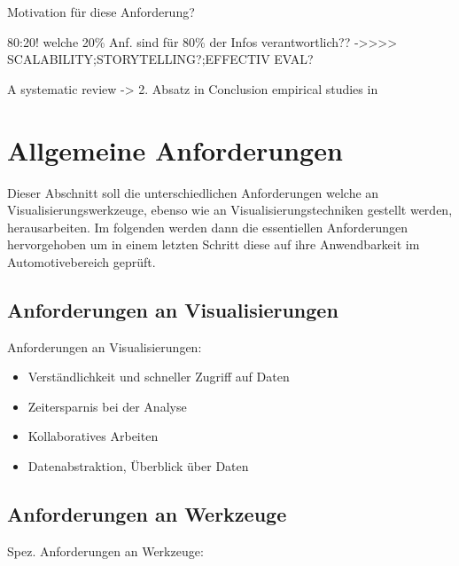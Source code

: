 \documentclass[draft=false
              ,paper=a4
              ,twoside=false
              ,fontsize=11pt
              ,headsepline
              ,BCOR10mm
              ,DIV11
              ]{scrbook}
\begin{document}
Motivation für diese Anforderung?

80:20! welche 20\% Anf. sind für 80\% der Infos verantwortlich??\newline
->>>> SCALABILITY;STORYTELLING?;EFFECTIV EVAL?

A systematic review -> 2. Absatz in Conclusion \cite{isenberg_systematic_2013} \newline
empirical studies in \cite{lam_empirical_2012}
\fi      %
\section{Allgemeine Anforderungen} %
\label{sec:allgemeine_anforderungen}

Dieser Abschnitt soll die unterschiedlichen Anforderungen welche an Visualisierungswerkzeuge, ebenso wie an Visualisierungstechniken gestellt werden, herausarbeiten. Im folgenden werden dann die essentiellen Anforderungen hervorgehoben um in einem letzten Schritt diese auf ihre Anwendbarkeit im Automotivebereich geprüft.


\subsection{Anforderungen an Visualisierungen} %
\label{sub:anforderungen_an_visualisierungen}

Anforderungen an Visualisierungen:

\begin{itemize}
  \item Verständlichkeit und schneller Zugriff auf Daten
  \item Zeitersparnis bei der Analyse
  \item Kollaboratives Arbeiten
  \item Datenabstraktion, Überblick über Daten
\end{itemize}

\subsection{Anforderungen an Werkzeuge} %
\label{sub:anforderungen_an_werkzeuge}

Spez. Anforderungen an Werkzeuge:
\end{document}
